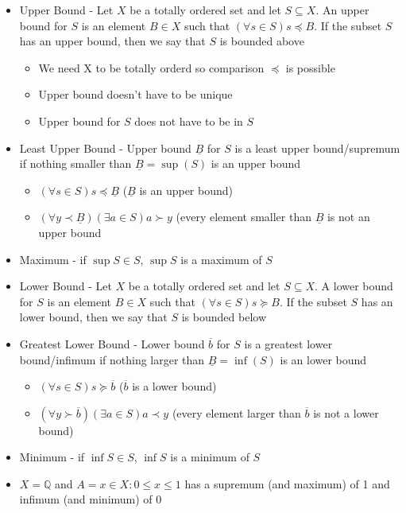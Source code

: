 \documentclass{article}
\begin{document}
\begin{itemize}
    \item Upper Bound - Let $X$ be a totally ordered set and let $S \subseteq X$. An upper bound for $S$ is an element $B \in X$ such that $(\forall s \in S)s \preceq B$. If the subset $S$ has an upper bound, then we say that $S$ is bounded above
    \begin{itemize}
        \item We need X to be totally orderd so comparison $\preceq$ is possible
        \item Upper bound doesn't have to be unique
        \item Upper bound for $S$ does not have to be in $S$
    \end{itemize}
    \item Least Upper Bound - Upper bound $\underline{B}$ for $S$ is a least upper bound/supremum if nothing smaller than $\underline{B}=\sup (S)$ is an upper bound
    \begin{itemize}
        \item $(\forall s \in S)s \preceq \underline{B}$ ($\underline{B}$ is an upper bound)
        \item $(\forall y \prec \underline{B})(\exists a \in S) a \succ y$ (every element smaller than $\underline{B}$ is not an upper bound
    \end{itemize}
    \item Maximum - if $\sup S \in S$, $\sup S$ is a maximum of $S$
    \item Lower Bound - Let $X$ be a totally ordered set and let $S \subseteq X$. A lower bound for $S$ is an element $B \in X$ such that $(\forall s \in S)s \succeq B$. If the subset $S$ has an lower bound, then we say that $S$ is bounded below
    \item Greatest Lower Bound - Lower bound $\overline{b}$ for $S$ is a greatest lower bound/infimum if nothing larger than $\underline{B}=\inf (S)$ is an lower bound
    \begin{itemize}
        \item $(\forall s \in S)s \succeq \overline{b}$ ($\overline{b}$ is a lower bound)
        \item $(\forall y \succ \overline{b})(\exists a \in S) a \prec y$ (every element larger than $\overline{b}$ is not a lower bound)
    \end{itemize}
    \item Minimum - if $\inf S \in S$, $\inf S$ is a minimum of $S$
    \item $X = \mathbb{Q}$ and $A={x \in X: 0 \le x \le 1}$ has a supremum (and maximum) of 1 and infimum (and minimum) of 0

\end{itemize}
\end{document}
